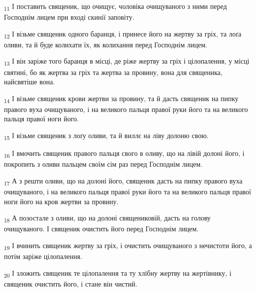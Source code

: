 \begin{tcolorbox}
\textsubscript{11} І поставить священик, що очищує, чоловіка очищуваного з ними перед Господнім лицем при вході скинії заповіту.
\end{tcolorbox}
\begin{tcolorbox}
\textsubscript{12} І візьме священик одного баранця, і принесе його на жертву за гріх, та лоґа оливи, та й буде колихати їх, як колихання перед Господнім лицем.
\end{tcolorbox}
\begin{tcolorbox}
\textsubscript{13} І він заріже того баранця в місці, де ріже жертву за гріх і цілопалення, у місці святині, бо як жертва за гріх та жертва за провину, вона для священика, найсвятіше вона.
\end{tcolorbox}
\begin{tcolorbox}
\textsubscript{14} І візьме священик крови жертви за провину, та й дасть священик на пипку правого вуха очищуваного, і на великого пальця правої руки його та на великого пальця правої ноги його.
\end{tcolorbox}
\begin{tcolorbox}
\textsubscript{15} І візьме священик з лоґу оливи, та й виллє на ліву долоню свою.
\end{tcolorbox}
\begin{tcolorbox}
\textsubscript{16} І вмочить священик правого пальця свого в оливу, що на лівій долоні його, і покропить з оливи пальцем своїм сім раз перед Господнім лицем.
\end{tcolorbox}
\begin{tcolorbox}
\textsubscript{17} А з решти оливи, що на долоні його, священик дасть на пипку правого вуха очищуваного, і на великого пальця правої руки його та на великого пальця правої ноги його на кров жертви за провину.
\end{tcolorbox}
\begin{tcolorbox}
\textsubscript{18} А позостале з оливи, що на долоні священиковій, дасть на голову очищуваного. І священик очистить його перед Господнім лицем.
\end{tcolorbox}
\begin{tcolorbox}
\textsubscript{19} І вчинить священик жертву за гріх, і очистить очищуваного з нечистоти його, а потім заріже цілопалення.
\end{tcolorbox}
\begin{tcolorbox}
\textsubscript{20} І зложить священик те цілопалення та ту хлібну жертву на жертівнику, і священик очистить його, і стане він чистий.
\end{tcolorbox}
